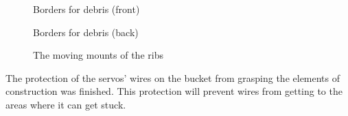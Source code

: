 \begin{figure}[H]
\begin{minipage}[h]{0.47\linewidth}
		\caption{Borders for debris (front)}
	\end{minipage}
	\hfill
	\begin{minipage}[h]{0.47\linewidth}
		\caption{Borders for debris (back)}
	\end{minipage}
	\hfill
	\begin{minipage}[h]{0.47\linewidth}
		\caption{The moving mounts of the ribs}
	\end{minipage}
\end{figure}

The protection of the servos' wires on the bucket from grasping the elements of construction was finished. This protection will prevent wires from getting to the areas where it can get stuck.

